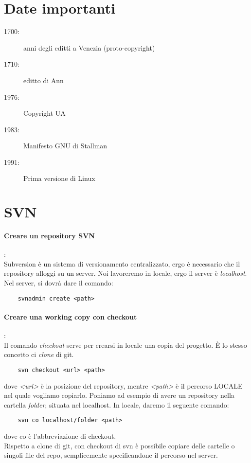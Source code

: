 \documentclass[a4paper]{article}
\begin{document}
	\section{Date importanti}
	
	\begin{description}
		\item[1700:] anni degli editti a Venezia (proto-copyright)
		\item[1710:] editto di Ann
		\item[1976:] Copyright UA
		\item[1983:] Manifesto GNU di Stallman
		\item[1991:] Prima versione di Linux
	\end{description}
	
	
	\section{SVN}
	
	\paragraph{Creare un repository SVN}: \\
	Subversion è un sistema di versionamento centralizzato, ergo è necessario che il repository alloggi su un server. Noi lavoreremo in locale, ergo il server è \textit{localhost}.
	Nel server, si dovrà dare il comando:
	\begin{verbatim}
	svnadmin create <path>
	\end{verbatim}
	
	\paragraph{Creare una working copy con checkout}:\\
	Il comando \textit{checkout} serve per crearsi in locale una copia del progetto. È lo stesso concetto ci \textit{clone} di git.
	\begin{verbatim}
	svn checkout <url> <path>
	\end{verbatim}
	dove \textit{<url>} è la posizione del repository, mentre \textit{<path>} è il percorso LOCALE nel quale vogliamo copiarlo.
	Poniamo ad esempio di avere un repository nella cartella \textit{folder}, situata nel localhost.
	In locale, daremo il seguente comando:
	\begin{verbatim}
	svn co localhost/folder <path>
	\end{verbatim}
	dove co è l'abbreviazione di checkout.\\
	Rispetto a clone di git, con checkout di svn è possibile copiare delle cartelle o singoli file del repo, semplicemente specificandone il percorso nel server.
	
\end{document}
